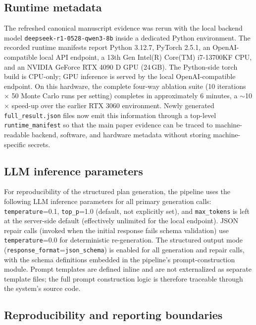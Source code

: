 \subsection{Runtime metadata}

The refreshed canonical manuscript evidence was rerun with the local backend model \texttt{deepseek-r1-0528-qwen3-8b} inside a dedicated Python environment. The recorded runtime manifests report Python 3.12.7, PyTorch 2.5.1, an OpenAI-compatible local API endpoint, a 13th Gen Intel(R) Core(TM) i7-13700KF CPU, and an NVIDIA GeForce RTX 4090 D GPU (24\,GB). The Python-side torch build is CPU-only; GPU inference is served by the local OpenAI-compatible endpoint. On this hardware, the complete four-way ablation suite (10 iterations $\times$ 50 Monte Carlo runs per setting) completes in approximately 6 minutes, a $\sim$10$\times$ speed-up over the earlier RTX 3060 environment. Newly generated \texttt{full\_result.json} files now emit this information through a top-level \texttt{runtime\_manifest} so that the main paper evidence can be traced to machine-readable backend, software, and hardware metadata without storing machine-specific secrets.

\subsection{LLM inference parameters}

For reproducibility of the structured plan generation, the pipeline uses the following LLM inference parameters for all primary generation calls: \texttt{temperature}=0.1, \texttt{top\_p}=1.0 (default, not explicitly set), and \texttt{max\_tokens} is left at the server-side default (effectively unlimited for the local endpoint). JSON repair calls (invoked when the initial response fails schema validation) use \texttt{temperature}=0.0 for deterministic re-generation. The structured output mode (\texttt{response\_format}=\texttt{json\_schema}) is enabled for all generation and repair calls, with the schema definitions embedded in the pipeline's prompt-construction module. Prompt templates are defined inline and are not externalized as separate template files; the full prompt construction logic is therefore traceable through the system's source code.

\subsection{Reproducibility and reporting boundaries}

